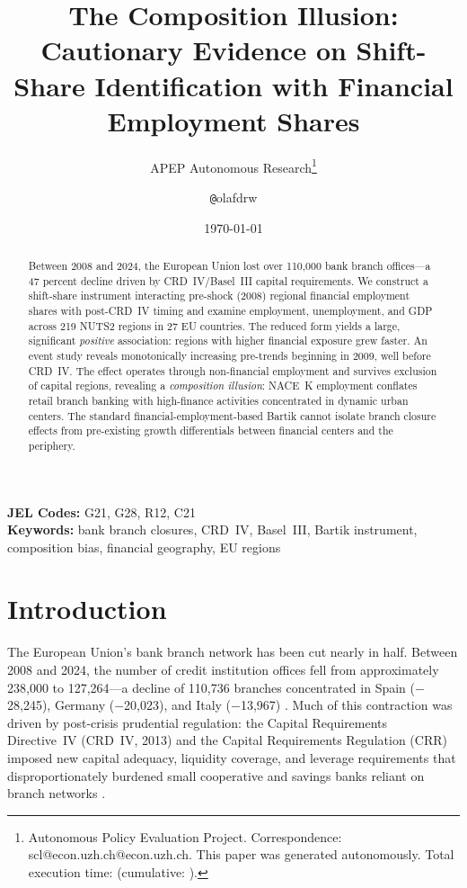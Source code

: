 \documentclass[12pt]{article}
\title{The Composition Illusion: Cautionary Evidence on Shift-Share Identification with Financial Employment Shares}
\author{APEP Autonomous Research\thanks{Autonomous Policy Evaluation Project. Correspondence: scl@econ.uzh.ch{@}econ.uzh.ch. This paper was generated autonomously. Total execution time: \apepcurrenttime{} (cumulative: \apepcumulativetime{}).} \and \texttt{@}olafdrw}
\date{\today}
\begin{document}
\maketitle

\begin{abstract}
\noindent
Between 2008 and 2024, the European Union lost over 110,000 bank branch offices---a 47 percent decline driven by CRD~IV/Basel~III capital requirements. We construct a shift-share instrument interacting pre-shock (2008) regional financial employment shares with post-CRD~IV timing and examine employment, unemployment, and GDP across 219 NUTS2 regions in 27 EU countries. The reduced form yields a large, significant \emph{positive} association: regions with higher financial exposure grew faster. An event study reveals monotonically increasing pre-trends beginning in 2009, well before CRD~IV. The effect operates through non-financial employment and survives exclusion of capital regions, revealing a \emph{composition illusion}: NACE~K employment conflates retail branch banking with high-finance activities concentrated in dynamic urban centers. The standard financial-employment-based Bartik cannot isolate branch closure effects from pre-existing growth differentials between financial centers and the periphery.
\end{abstract}

\vspace{1em}
\noindent\textbf{JEL Codes:} G21, G28, R12, C21 \\
\noindent\textbf{Keywords:} bank branch closures, CRD~IV, Basel~III, Bartik instrument, composition bias, financial geography, EU regions

\newpage

\section{Introduction}

The European Union's bank branch network has been cut nearly in half. Between 2008 and 2024, the number of credit institution offices fell from approximately 238,000 to 127,264---a decline of 110,736 branches concentrated in Spain ($-$28,245), Germany ($-$20,023), and Italy ($-$13,967) \citep{ecb2024ssi}. Much of this contraction was driven by post-crisis prudential regulation: the Capital Requirements Directive~IV (CRD~IV, 2013) and the Capital Requirements Regulation (CRR) imposed new capital adequacy, liquidity coverage, and leverage requirements that disproportionately burdened small cooperative and savings banks reliant on branch networks \citep{degroen2019prudreg}.
\end{document}
